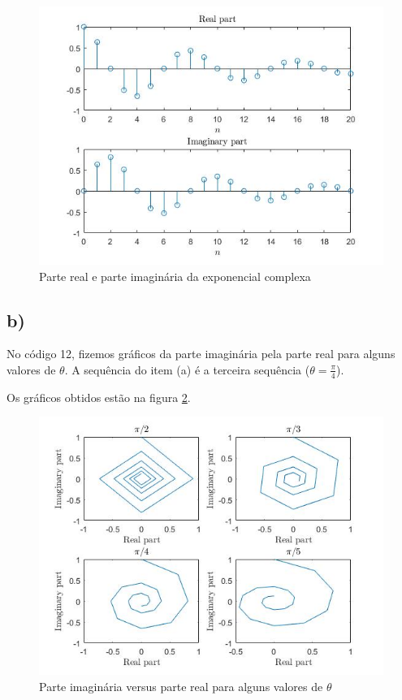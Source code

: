 \documentclass[a4paper, 12pt]{article}
\begin{document}
\begin{figure}[H]
	\centering
	\includegraphics[scale=0.7]{../Imagens/ex4/a.jpg}  
	\caption{Parte real e parte imaginária da exponencial complexa}
	\label{fig:4a}
\end{figure}

\subsection{b)}

No código 12, fizemos gráficos da parte imaginária pela parte real para alguns valores de $\theta$. A sequência do item (a) é a terceira sequência ($\theta=\frac{\pi}{4}$).



Os gráficos obtidos estão na figura \ref{fig:4b}.

\begin{figure}[H]
	\centering
	\includegraphics[scale=0.7]{../Imagens/ex4/b.jpg}  
	\caption{Parte imaginária versus parte real para alguns valores de $\theta$}
	\label{fig:4b}
\end{figure}
\end{document}
